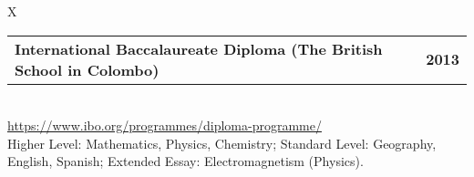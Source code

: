 \documentclass[10pt]{article}
\newcommand{\tabularxwidth}{\textwidth}
\begin{document}
            \begin{minipage}{\tabularxwidth}
            \begin{tabularx}{\tabularxwidth}{X}
                {
                    \begin{tabularx}{\tabularxwidth}{@{}X r}
                        \textbf{International Baccalaureate Diploma (The British School in Colombo)} &
                        \textbf{
        2013} \\
                    \end{tabularx}
                } \\
                    \url{https://www.ibo.org/programmes/diploma-programme/} \\
                
                    
    Higher Level: Mathematics, Physics, Chemistry; Standard Level: Geography, English, Spanish; Extended Essay: Electromagnetism (Physics). \\
                
            \end{tabularx}

            
                \vspace{.5em}
            

            

            \end{minipage}
        
\end{document}
